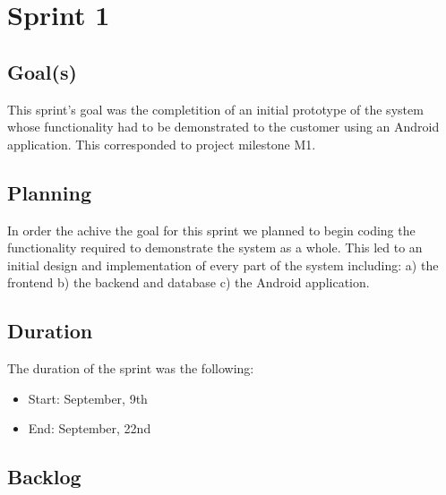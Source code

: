 

\chapter{Sprint 1}
\label{Sprint0}

\section{Goal(s)}
This sprint's goal was the completition of an initial prototype of the system whose functionality
had to be demonstrated to the customer using an Android application. This corresponded to project milestone M1.

\section{Planning}
In order the achive the goal for this sprint we planned to begin coding the functionality required to demonstrate
the system as a whole. This led to an initial design and implementation of every part of the system including:
a) the frontend b) the backend and database c) the Android application.

\section{Duration}
The duration of the sprint was the following:
\begin{itemize}
\item Start: September, 9th
\item End: September, 22nd
\end{itemize}

\section{Backlog}


